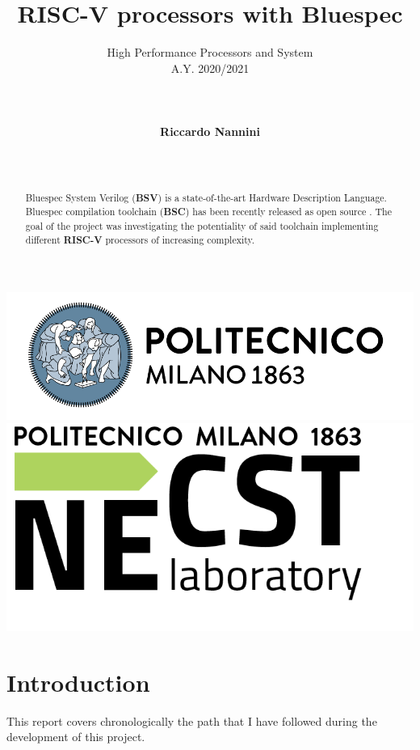 \documentclass[12pt,oneside,a4paper]{article}
\title{\textbf{RISC-V processors with Bluespec}}
\author{High Performance Processors and System\\ A.Y. 2020/2021\\\\\\\\\textbf{Riccardo Nannini}\\\\\\}
\date{\parbox{\linewidth}{\centering%
		\today\endgraf\bigskip\bigskip\bigskip\bigskip\bigskip
		Tutors: Emanuele Del Sozzo, \endgraf\medskip
		Davide Conficconi \endgraf\bigskip\bigskip
		Professor: Marco Domenico Santambrogio 
		}}
\begin{document}
\begin{titlepage}
	\centering
	\clearpage
	\maketitle
	\thispagestyle{empty}
	\vspace*{1cm}
	\vfill
	\centering
	\includegraphics{logo_polimi.png}\includegraphics{logo_NECST.png}
\end{titlepage}

\tableofcontents
\newpage

\begin{abstract}
Bluespec System Verilog (\textbf{BSV}) is a state-of-the-art Hardware Description Language.
Bluespec compilation toolchain (\textbf{BSC}) has been recently released as open source \cite{bsc}. The goal of the project was investigating the potentiality of said toolchain implementing different \textbf{RISC-V} processors of increasing complexity.\\
\end{abstract}

\section{Introduction} \label{sec:intro}

This report covers chronologically the path that I have followed during the development of this project.
 
\end{document}
